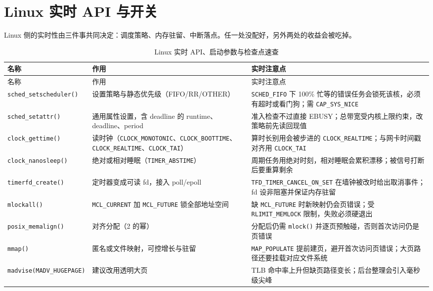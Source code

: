 \documentclass[12pt,a4paper,fontset=fandol]{ctexbook}
\newcommand{\Fn}[1]{\texttt{#1()}}
\newcommand{\Tp}[1]{\texttt{#1}}
\begin{document}
\section{Linux 实时 API 与开关}

Linux 侧的实时性由三件事共同决定：调度策略、内存驻留、中断落点。任一处没配好，另外两处的收益会被吃掉。

\begin{longtable}{>{\raggedright\arraybackslash\footnotesize}p{} >{\raggedright\arraybackslash\footnotesize}p{} >{\raggedright\arraybackslash\footnotesize}p{}}
\caption{Linux 实时 API、启动参数与检查点速查}\label{tab:apB-linuxrt} \\
\toprule 名称 & 作用 & 实时注意点 \\ \midrule
\endfirsthead
\toprule 名称 & 作用 & 实时注意点 \\ \midrule
\endhead
\bottomrule \endfoot
\endlastfoot
\Fn{sched\_setscheduler} & 设置策略与静态优先级（FIFO/RR/OTHER） & \Tp{SCHED\_FIFO} 下 100\% 忙等的错误任务会锁死该核，必须有超时或看门狗；需 \Tp{CAP\_SYS\_NICE} \\
\Fn{sched\_setattr} & 通用属性设置，含 deadline 的 runtime、deadline、period & 准入检查不过直接 EBUSY；总带宽受内核上限约束，改策略前先读回现值 \\
\Fn{clock\_gettime} & 读时钟（\Tp{CLOCK\_MONOTONIC}、\Tp{CLOCK\_BOOTTIME}、\Tp{CLOCK\_REALTIME}、\Tp{CLOCK\_TAI}） & 算时长别用会被步进的 \Tp{CLOCK\_REALTIME}；与网卡时间戳对齐用 \Tp{CLOCK\_TAI} \\
\Fn{clock\_nanosleep} & 绝对或相对睡眠（\Tp{TIMER\_ABSTIME}） & 周期任务用绝对时刻，相对睡眠会累积漂移；被信号打断后要重算剩余 \\
\Fn{timerfd\_create} & 定时器变成可读 fd，接入 poll/epoll & \Tp{TFD\_TIMER\_CANCEL\_ON\_SET} 在墙钟被改时给出取消事件；fd 设非阻塞并保证内存驻留 \\
\Fn{mlockall} & \Tp{MCL\_CURRENT} 加 \Tp{MCL\_FUTURE} 锁全部地址空间 & 缺 \Tp{MCL\_FUTURE} 时新映射仍会页错误；受 \Tp{RLIMIT\_MEMLOCK} 限制，失败必须硬退出 \\
\Fn{posix\_memalign} & 对齐分配（2 的幂） & 分配后仍需 \Fn{mlock} 并逐页预触碰，否则首次访问仍是页错误 \\
\Fn{mmap} & 匿名或文件映射，可控增长与驻留 & \Tp{MAP\_POPULATE} 提前建页，避开首次访问页错误；大页路径还要挂载对应文件系统 \\
\Tp{madvise(MADV\_HUGEPAGE)} & 建议改用透明大页 & TLB 命中率上升但缺页路径变长；后台整理会引入毫秒级尖峰 \\

\end{longtable}
\end{document}
